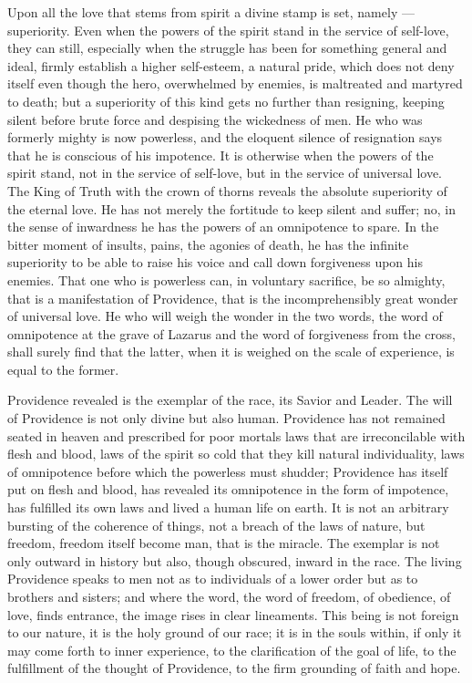 \documentclass[12pt,a4paper,openany]{book}
\newcommand{\opage}[1]{\marginnote{\footnotesize\textit{[#1]}}}
\begin{document}
Upon all the love that stems from spirit a divine stamp is set, namely --- superiority. Even when the powers of the
spirit stand in the service of self-love, they can still, especially when the struggle has been for something general
and ideal, firmly establish a higher
\setcounter{footnote}{0}%
\opage{68}self-esteem, a natural pride, which does not deny itself even though the hero, overwhelmed by enemies, is
maltreated and martyred to death; but a superiority of this kind gets no further than resigning, keeping silent before
brute force and despising the wickedness of men. He who was formerly mighty is now powerless, and the eloquent silence
of resignation says that he is conscious of his impotence. It is otherwise when the powers of the spirit stand, not in
the service of self-love, but in the service of universal love. The King of Truth with the crown of thorns reveals the
absolute superiority of the eternal love. He has not merely the fortitude to keep silent and suffer; no, in the sense
of inwardness he has the powers of an omnipotence to spare. In the bitter moment of insults, pains, the agonies of
death, he has the infinite superiority to be able to raise his voice and call down forgiveness upon his enemies. That
one who is powerless can, in voluntary sacrifice, be so almighty, that is a manifestation of Providence, that is the
incomprehensibly great wonder of universal love. He who will weigh the wonder in the two words, the word of omnipotence
at the grave of Lazarus and the word of forgiveness from the cross, shall surely find that the latter, when it is
weighed on the scale of experience, is equal to the former.

Providence revealed is the exemplar of the race, its Savior and Leader. The will of Providence is not only divine but
also human. Providence has not remained seated in heaven and prescribed for poor mortals laws that are irreconcilable
with flesh and blood, laws of the spirit so cold that they kill natural individuality, laws of omnipotence before
which the powerless must shudder; Providence has itself put on flesh and blood, has revealed its omnipotence in the
form of impotence, has fulfilled
\setcounter{footnote}{0}%
\opage{69}its own laws and lived a human life on earth. It is not an arbitrary bursting of the coherence of things, not
a breach of the laws of nature, but freedom, freedom itself become man, that is the miracle. The exemplar is not only
outward in history but also, though obscured, inward in the race. The living Providence speaks to men not as to
individuals of a lower order but as to brothers and sisters; and where the word, the word of freedom, of obedience, of
love, finds entrance, the image rises in clear lineaments. This being is not foreign to our nature, it is the holy
ground of our race; it is in the souls within, if only it may come forth to inner experience, to the clarification of
the goal of life, to the fulfillment of the thought of Providence, to the firm grounding of faith and hope.
\end{document}

